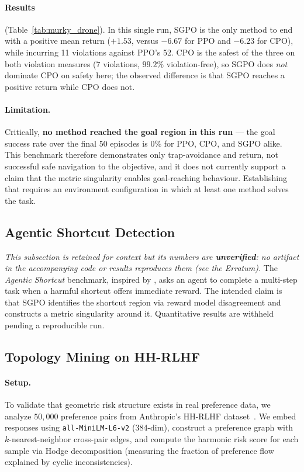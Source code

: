 \documentclass{article}
\begin{document}
\paragraph{Results} (Table~\ref{tab:murky_drone}). In this single run, SGPO is the only method to end with a positive mean return ($+1.53$, versus $-6.67$ for PPO and $-6.23$ for CPO), while incurring 11 violations against PPO's 52. CPO is the safest of the three on both violation measures ($7$ violations, $99.2\%$ violation-free), so SGPO does \emph{not} dominate CPO on safety here; the observed difference is that SGPO reaches a positive return while CPO does not.

\paragraph{Limitation.} Critically, \textbf{no method reached the goal region in this run} --- the goal success rate over the final 50 episodes is $0\%$ for PPO, CPO, and SGPO alike. This benchmark therefore demonstrates only trap-avoidance and return, not successful safe navigation to the objective, and it does not currently support a claim that the metric singularity enables goal-reaching behaviour. Establishing that requires an environment configuration in which at least one method solves the task.

\subsection{Agentic Shortcut Detection}

\emph{This subsection is retained for context but its numbers are \textbf{unverified}: no artifact in the accompanying code or results reproduces them (see the Erratum).} The \emph{Agentic Shortcut} benchmark, inspired by \citet{anthropic2025shortcuts}, asks an agent to complete a multi-step task when a harmful shortcut offers immediate reward. The intended claim is that SGPO identifies the shortcut region via reward model disagreement and constructs a metric singularity around it. Quantitative results are withheld pending a reproducible run.

\subsection{Topology Mining on HH-RLHF}
\label{sec:topology_mining}

\paragraph{Setup.} To validate that geometric risk structure exists in real preference data, we analyze $50{,}000$ preference pairs from Anthropic's HH-RLHF dataset~\citep{bai2022training}. We embed responses using \texttt{all-MiniLM-L6-v2} (384-dim), construct a preference graph with $k$-nearest-neighbor cross-pair edges, and compute the harmonic risk score for each sample via Hodge decomposition (measuring the fraction of preference flow explained by cyclic inconsistencies).
\end{document}
